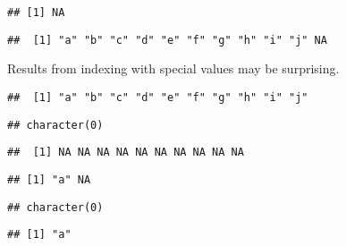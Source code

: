 \documentclass[paper=a4,10pt,div=17,headsepline,BCOR=12mm,twoside,open=right]{scrbook}\usepackage{knitr}
\begin{document}
\begin{knitrout}\footnotesize
{}\color{fgcolor}\begin{kframe}
\begin{alltt}
\hlstd{a[}\hlstd{]}
\end{alltt}
\begin{verbatim}
## [1] NA
\end{verbatim}
\begin{alltt}
\hlstd{a[}\hlopt{:}\hlstd{]}
\end{alltt}
\begin{verbatim}
##  [1] "a" "b" "c" "d" "e" "f" "g" "h" "i" "j" NA
\end{verbatim}
\end{kframe}
\end{knitrout}

Results from indexing with special values may be surprising.

\begin{knitrout}\footnotesize
{}\color{fgcolor}\begin{kframe}
\begin{alltt}
\end{alltt}
\begin{verbatim}
##  [1] "a" "b" "c" "d" "e" "f" "g" "h" "i" "j"
\end{verbatim}
\begin{alltt}
\hlstd{a[}\hlstd{(}\hlstd{)]}
\end{alltt}
\begin{verbatim}
## character(0)
\end{verbatim}
\begin{alltt}
\hlstd{a[}\hlstd{]}
\end{alltt}
\begin{verbatim}
##  [1] NA NA NA NA NA NA NA NA NA NA
\end{verbatim}
\begin{alltt}
\hlstd{a[}\hlstd{(}\hlstd{,} \hlstd{)]}
\end{alltt}
\begin{verbatim}
## [1] "a" NA
\end{verbatim}
\begin{alltt}
\hlstd{a[}\hlstd{]}
\end{alltt}
\begin{verbatim}
## character(0)
\end{verbatim}
\begin{alltt}
\hlstd{a[}\hlstd{(}\hlstd{,} \hlstd{)]}
\end{alltt}
\begin{verbatim}
## [1] "a"
\end{verbatim}
\end{kframe}
\end{knitrout}
\end{document}
